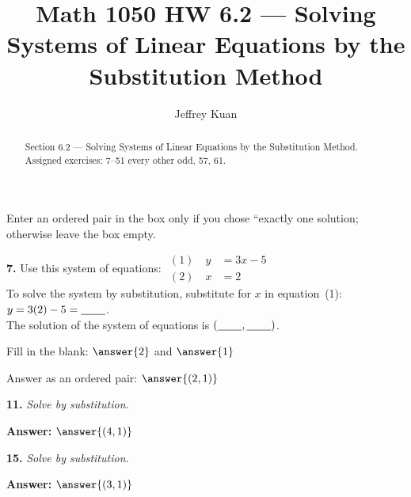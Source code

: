 \documentclass{ximera}
\author{Jeffrey Kuan}
\title{Math 1050 HW 6.2 --- Solving Systems of Linear Equations by the Substitution Method}
\begin{document}
\begin{abstract}
    Section 6.2 --- Solving Systems of Linear Equations by the Substitution Method.
    Assigned exercises: 7–51 every other odd, 57, 61.
\end{abstract}

\maketitle

Enter an ordered pair in the box only if you chose ``exactly one solution; otherwise leave the box empty.

\begin{problem}
\textbf{7.} Use this system of equations: \quad
  $\begin{aligned}(1)\quad y &= 3x - 5\\ (2)\quad x &= 2\end{aligned}$
  \\[3pt]
  To solve the system by substitution, substitute \blank{} for $x$ in equation~(1):
  $y = 3(2) - 5 = \underline{\hspace{2.2em}}$.
  \\[2pt]
  The solution of the system of equations is $(\underline{\hspace{2.2em}}, \underline{\hspace{2.2em}})$.

Fill in the blank:  $\answer{2}$ and $\answer{1}$

Answer as an ordered pair:
$\answer{(2, 1)}$
\end{problem}

\begin{problem}
\textbf{11.} \emph{Solve by substitution.}\quad {}

\begin{multipleChoice}
\end{multipleChoice}

\textbf{Answer:} $\answer{(4, 1)}$
\end{problem}

\begin{problem}
\textbf{15.} \emph{Solve by substitution.}\quad {}

\begin{multipleChoice}
\end{multipleChoice}

\textbf{Answer:} $\answer{(3, 1)}$
\end{problem}
\end{document}
